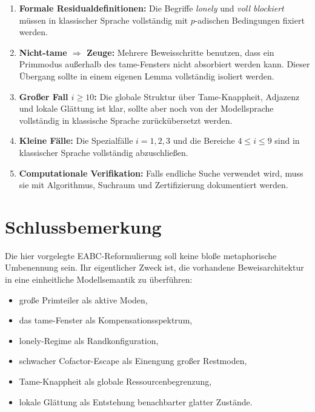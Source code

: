 \documentclass[12pt,a4paper]{article}
\theoremstyle{plain}
\theoremstyle{definition}
\theoremstyle{remark}
\begin{document}
	\begin{enumerate}[label=\arabic*)]
		\item \textbf{Formale Residualdefinitionen:}  
		Die Begriffe \emph{lonely} und \emph{voll blockiert} müssen in klassischer Sprache vollständig mit \(p\)-adischen Bedingungen fixiert werden.
		
		\item \textbf{Nicht-tame \(\Rightarrow\) Zeuge:}  
		Mehrere Beweisschritte benutzen, dass ein Primmodus außerhalb des tame-Fensters nicht absorbiert werden kann. Dieser Übergang sollte in einem eigenen Lemma vollständig isoliert werden.
		
		\item \textbf{Großer Fall \(i\ge10\):}  
		Die globale Struktur über Tame-Knappheit, Adjazenz und lokale Glättung ist klar, sollte aber noch von der Modellsprache vollständig in klassische Sprache zurückübersetzt werden.
		
		\item \textbf{Kleine Fälle:}  
		Die Spezialfälle \(i=1,2,3\) und die Bereiche \(4\le i\le9\) sind in klassischer Sprache vollständig abzuschließen.
		
		\item \textbf{Computationale Verifikation:}  
		Falls endliche Suche verwendet wird, muss sie mit Algorithmus, Suchraum und Zertifizierung dokumentiert werden.
	\end{enumerate}
	
	\section{Schlussbemerkung}
	
	Die hier vorgelegte EABC-Reformulierung soll keine bloße metaphorische Umbenennung sein. Ihr eigentlicher Zweck ist, die vorhandene Beweisarchitektur in eine einheitliche Modellsemantik zu überführen:
	
	\begin{itemize}
		\item große Primteiler als aktive Moden,
		\item das tame-Fenster als Kompensationsspektrum,
		\item lonely-Regime als Randkonfiguration,
		\item schwacher Cofactor-Escape als Einengung großer Restmoden,
		\item Tame-Knappheit als globale Ressourcenbegrenzung,
		\item lokale Glättung als Entstehung benachbarter glatter Zustände.
	\end{itemize}
	
\end{document}
